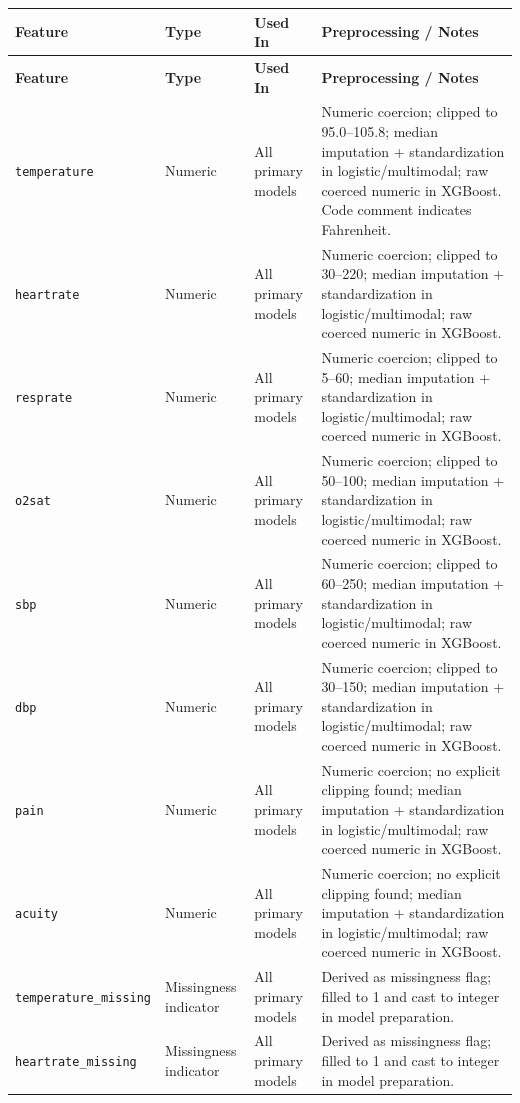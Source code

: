 \renewcommand{\arraystretch}{1.15}
\small
\begin{longtable}{p{2.6cm} p{2.2cm} p{2.3cm} p{6.8cm}}
\toprule
\textbf{Feature} & \textbf{Type} & \textbf{Used In} & \textbf{Preprocessing / Notes} \\
\midrule
\endfirsthead

\toprule
\textbf{Feature} & \textbf{Type} & \textbf{Used In} & \textbf{Preprocessing / Notes} \\
\midrule
\endhead

\texttt{temperature} & Numeric & All primary models & Numeric coercion; clipped to 95.0--105.8; median imputation + standardization in logistic/multimodal; raw coerced numeric in XGBoost. Code comment indicates Fahrenheit. \\
\texttt{heartrate} & Numeric & All primary models & Numeric coercion; clipped to 30--220; median imputation + standardization in logistic/multimodal; raw coerced numeric in XGBoost. \\
\texttt{resprate} & Numeric & All primary models & Numeric coercion; clipped to 5--60; median imputation + standardization in logistic/multimodal; raw coerced numeric in XGBoost. \\
\texttt{o2sat} & Numeric & All primary models & Numeric coercion; clipped to 50--100; median imputation + standardization in logistic/multimodal; raw coerced numeric in XGBoost. \\
\texttt{sbp} & Numeric & All primary models & Numeric coercion; clipped to 60--250; median imputation + standardization in logistic/multimodal; raw coerced numeric in XGBoost. \\
\texttt{dbp} & Numeric & All primary models & Numeric coercion; clipped to 30--150; median imputation + standardization in logistic/multimodal; raw coerced numeric in XGBoost. \\
\texttt{pain} & Numeric & All primary models & Numeric coercion; no explicit clipping found; median imputation + standardization in logistic/multimodal; raw coerced numeric in XGBoost. \\
\texttt{acuity} & Numeric & All primary models & Numeric coercion; no explicit clipping found; median imputation + standardization in logistic/multimodal; raw coerced numeric in XGBoost. \\
\texttt{temperature\_missing} & Missingness indicator & All primary models & Derived as missingness flag; filled to 1 and cast to integer in model preparation. \\
\texttt{heartrate\_missing} & Missingness indicator & All primary models & Derived as missingness flag; filled to 1 and cast to integer in model preparation. \\

\end{longtable}

